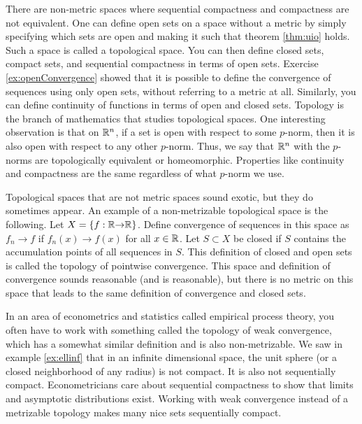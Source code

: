 \begin{remark}
  There are non-metric spaces where sequential compactness and
  compactness are not equivalent. One can define open sets on a space
  without a metric by simply specifying which sets are open and making
  it such that theorem \ref{thm:uio} holds. Such a space is called a
  topological space. You can then define closed sets, compact sets,
  and sequential compactness in terms of open sets.  Exercise
  \ref{ex:openConvergence} showed that it is possible to define the
  convergence of sequences using only open sets, without referring to
  a metric at all. Similarly, you can define continuity of functions
  in terms of open and closed sets. Topology is the branch of
  mathematics that studies topological spaces. One interesting
  observation is that on $\mathbb{R}^n$, if a set is open with respect to some
  $p$-norm, then it is also open with respect to any other
  $p$-norm. Thus, we say that $\mathbb{R}^n$ with the $p$-norms are
  topologically equivalent or homeomorphic. Properties like continuity
  and compactness are the same regardless of what $p$-norm we use.
  
  Topological spaces that are not metric spaces sound exotic, but they
  do sometimes appear. An example of a non-metrizable topological
  space is the following. Let $X = \{f: \mathbb{R} {\rightarrow} \mathbb{R}\}$. Define
  convergence of sequences in this space as $f_n \to f$ if
  $f_n(x) \to f(x)$ for all $x \in \mathbb{R}$. Let $S \subset X$ be closed if
  $S$ contains the accumulation points of all sequences in $S$. This
  definition of closed and open sets is called the topology of
  pointwise convergence. This space and definition of convergence
  sounds reasonable (and is reasonable), but there is no metric on
  this space that leads to the same definition of convergence and
  closed sets.

  In an area of econometrics and statistics called empirical process
  theory, you often have to work with something called the topology of
  weak convergence, which has a somewhat similar definition and is
  also non-metrizable. We saw in example \ref{ex:ellinf} that in an
  infinite dimensional space, the unit sphere (or a closed
  neighborhood of any radius) is not compact. It is also not
  sequentially compact. Econometricians care about sequential
  compactness to show that limits and asymptotic distributions
  exist. Working with weak convergence instead of a metrizable
  topology makes many nice sets sequentially compact.
\end{remark}

